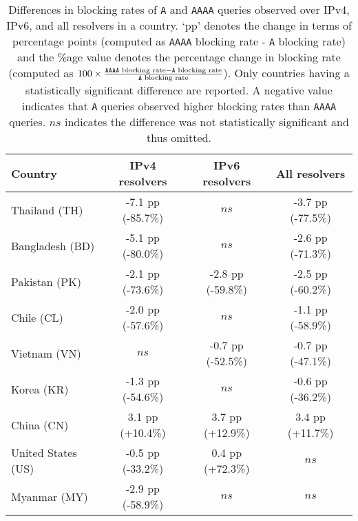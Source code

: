 \begin{table}[th]
  \centering
  \small
  \scalebox{\tabularscale} {
  \begin{tabular}{lccc}%
    \toprule
    {\bf Country}&{\bf IPv4 resolvers}&{\bf IPv6 resolvers} & {\bf All resolvers}
    \\ \midrule
    Thailand (TH)      & -7.1 pp (-85.7\%) & $ns$               & -3.7 pp (-77.5\%) \\
    Bangladesh (BD)    & -5.1 pp (-80.0\%) & $ns$               & -2.6 pp (-71.3\%) \\
    Pakistan (PK)      & -2.1 pp (-73.6\%) & -2.8 pp (-59.8\%)  & -2.5 pp (-60.2\%) \\
    Chile (CL)         & -2.0 pp (-57.6\%) & $ns$               & -1.1 pp (-58.9\%) \\
    Vietnam (VN)       & $ns$              & -0.7 pp (-52.5\%)  & -0.7 pp (-47.1\%) \\
    Korea (KR)         & -1.3 pp (-54.6\%) & $ns$               & -0.6 pp (-36.2\%) \\
    China (CN)         &  3.1 pp (+10.4\%) &  3.7 pp (+12.9\%)  &  3.4 pp (+11.7\%) \\
    \midrule
    United States (US) & -0.5 pp (-33.2\%) &  0.4 pp (+72.3\%)  &  $ns$  \\
    Myanmar (MY)       & -2.9 pp (-58.9\%) & $ns$    &  $ns$  \\
    \bottomrule
  \end{tabular}
  }
  \caption{Differences in blocking rates of {\tt A} and {\tt AAAA} queries
  observed over IPv4, IPv6, and all resolvers in a country. `pp' denotes the
  change in terms of percentage points (computed as {\tt AAAA} blocking rate
  - {\tt A} blocking rate) and the \%age value denotes the percentage change in
  blocking rate (computed as
  $
  100\times\frac{\text{{\tt AAAA} blocking rate} - \text{{\tt A} blocking rate}}
  {\text{{\tt A} blocking rate}}
  $). 
  Only countries having
  a statistically significant difference are reported. A negative value
  indicates that {\tt A} queries observed higher blocking rates than {\tt AAAA}
  queries. $ns$ indicates the difference was not statistically significant and
  thus omitted.}
  \label{tab:resources:countries}
\end{table}

